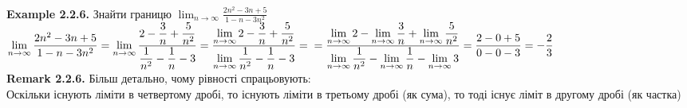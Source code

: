 \documentclass[a4paper, 14pt]{extarticle}
\def\bigline{\vspace{5mm}\\}
\def\rm#1{\textbf{Remark {#1}}}
\def\bigline{\vspace{5mm}\\}
\begin{document}
	\bigline
	\textbf{Example 2.2.6.} Знайти границю $\displaystyle\lim_{n \to \infty} \frac{2n^2-3n+5}{1-n-3n^2}$\\
	$\displaystyle\lim_{n \to \infty} \frac{2n^2-3n+5}{1-n-3n^2} =\lim_{n \to \infty} \frac{\displaystyle 2-\frac{3}{n}+\frac{5}{n^2}}{\displaystyle \frac{1}{n^2}-\frac{1}{n}-3} = \frac{\displaystyle \lim_{n \to \infty} 2-\frac{3}{n}+\frac{5}{n^2}}{\displaystyle \lim_{n \to \infty} \frac{1}{n^2}-\frac{1}{n}-3} =\\ = \frac{\displaystyle \lim_{n \to \infty} 2- \lim_{n \to \infty} \frac{3}{n}+ \lim_{n \to \infty} \frac{5}{n^2}}{\displaystyle \lim_{n \to \infty} \frac{1}{n^2}- \lim_{n \to \infty}\frac{1}{n}- \lim_{n \to \infty} 3} = \frac{2-0+5}{0-0-3} = -\frac{2}{3}$\bigline
	\rm{2.2.6.} Більш детально, чому рівності спрацьовують:\\
	Оскільки існують ліміти в четвертому дробі, то існують ліміти в третьому дробі (як сума), то тоді існує ліміт в другому дробі (як частка)\\
	
	
\end{document}

